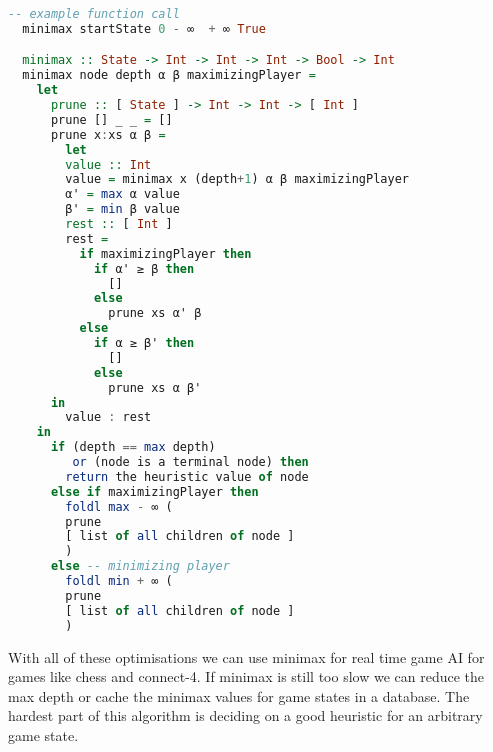 \documentclass[12pt]{article}
\begin{document}
  \begin{footnotesize} 
  \begin{lstlisting}[language=Haskell]
  -- example function call
  minimax startState 0 - ∞  + ∞ True

  minimax :: State -> Int -> Int -> Int -> Bool -> Int
  minimax node depth α β maximizingPlayer =
    let
      prune :: [ State ] -> Int -> Int -> [ Int ]
      prune [] _ _ = []
      prune x:xs α β = 
        let
        value :: Int
        value = minimax x (depth+1) α β maximizingPlayer
        α' = max α value
        β' = min β value
        rest :: [ Int ]
        rest = 
          if maximizingPlayer then
            if α' ≥ β then
              []
            else
              prune xs α' β 
          else 
            if α ≥ β' then
              []
            else
              prune xs α β'
      in
        value : rest
    in
      if (depth == max depth) 
         or (node is a terminal node) then
        return the heuristic value of node
      else if maximizingPlayer then
        foldl max - ∞ (
        prune
        [ list of all children of node ]
        )
      else -- minimizing player 
        foldl min + ∞ (
        prune 
        [ list of all children of node ]
        )
  \end{lstlisting}   
  \end{footnotesize} 
  
  
  
  
  \begin{paragraph}
    \qquad With all of these optimisations we can use minimax for real time game AI for games like chess and connect-4. If minimax is still too slow we can reduce the max depth or cache the minimax values for game states in a database. The hardest part of this algorithm is deciding on a good heuristic for an arbitrary game state.
  \end{paragraph}
  \pagebreak
  \printbibliography{}
\end{document}
